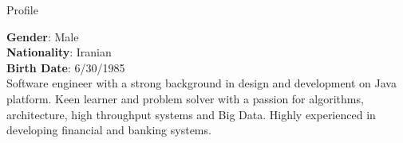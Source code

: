 
\begin{jrsection}[location = sidebar]{Profile}
    \begin{jrdescription}
        {\bfseries Gender}: Male \\
        {\bfseries Nationality}: Iranian \\
        {\bfseries Birth Date}: 6/30/1985 \\
        Software engineer with a strong background in design and development on Java platform.
        Keen learner and problem solver with a passion for algorithms, architecture, high throughput systems and Big Data.
        Highly experienced in developing financial and banking systems.
    \end{jrdescription}
\end{jrsection}
